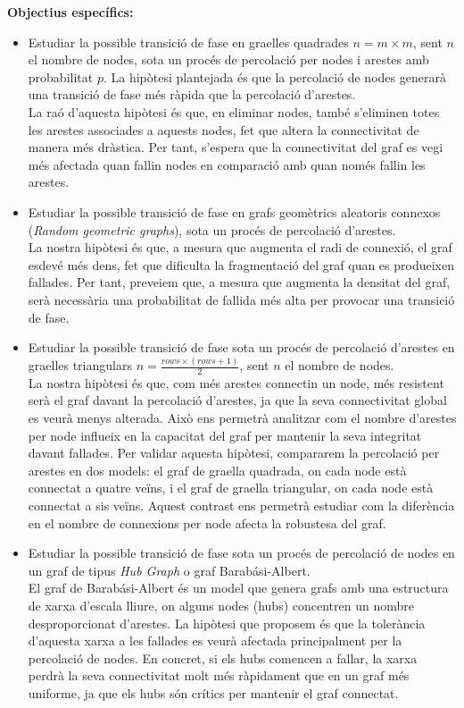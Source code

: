 \documentclass[a4paper]{article}
\begin{document}
	\textbf{Objectius específics:}
	\begin{itemize}
		\item Estudiar la possible transició de fase en graelles quadrades $n = m \times m$, sent $n$ el nombre de nodes, sota un procés de percolació per nodes i arestes amb probabilitat $p$. La hipòtesi plantejada és que la percolació de nodes generarà una transició de fase més ràpida que la percolació d'arestes. \\\endgraf
		La raó d'aquesta hipòtesi és que, en eliminar nodes, també s'eliminen totes les arestes associades a aquests nodes, fet que altera la connectivitat de manera més dràstica. Per tant, s'espera que la connectivitat del graf es vegi més afectada quan fallin nodes en comparació amb quan només fallin les arestes.
		
		\item Estudiar la possible transició de fase en grafs geomètrics aleatoris connexos (\textit{Random geometric graphs}), sota un procés de percolació d’arestes. \\\endgraf
		La nostra hipòtesi és que, a mesura que augmenta el radi de connexió, el graf esdevé més dens, fet que dificulta la fragmentació del graf quan es produeixen fallades. Per tant, preveiem que, a mesura que augmenta la densitat del graf, serà necessària una probabilitat de fallida més alta per provocar una transició de fase.
		
		\item Estudiar la possible transició de fase sota un procés de percolació d'arestes en graelles triangulars $n = \frac{rows \times (rows + 1)}{2}$, sent $n$ el nombre de nodes. \\\endgraf
		La nostra hipòtesi és que, com més arestes connectin un node, més resistent serà el graf davant la percolació d'arestes, ja que la seva connectivitat global es veurà menys alterada. Això ens permetrà analitzar com el nombre d'arestes per node influeix en la capacitat del graf per mantenir la seva integritat davant fallades. Per validar aquesta hipòtesi, compararem la percolació per arestes en dos models: el graf de graella quadrada, on cada node està connectat a quatre veïns, i el graf de graella triangular, on cada node està connectat a sis veïns. Aquest contrast ens permetrà estudiar com la diferència en el nombre de connexions per node afecta la robustesa del graf.
		
		\item Estudiar la possible transició de fase sota un procés de percolació de nodes en un graf de tipus \textit{Hub Graph} o graf Barabási-Albert. \\\endgraf
		El graf de Barabási-Albert és un model que genera grafs amb una estructura de xarxa d'escala lliure, on alguns nodes (hubs) concentren un nombre desproporcionat d'arestes. La hipòtesi que proposem és que la tolerància d'aquesta xarxa a les fallades es veurà afectada principalment per la percolació de nodes. En concret, si els hubs comencen a fallar, la xarxa perdrà la seva connectivitat molt més ràpidament que en un graf més uniforme, ja que els hubs són crítics per mantenir el graf connectat.
	\end{itemize}
	
\end{document}
